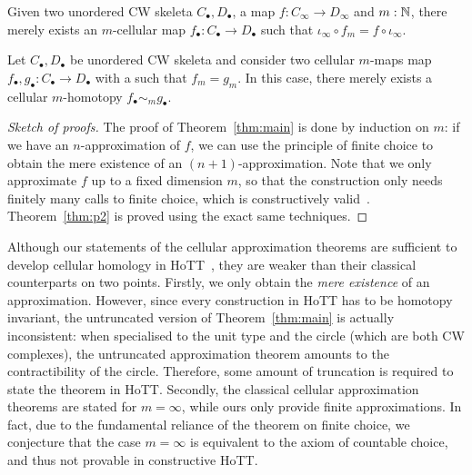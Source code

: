 \documentclass{easychair}
\begin{document}
\begin{theorem}\label{thm:main}
  Given two unordered CW skeleta $C_\bullet,D_\bullet$, a map $f : C_\infty \to  D_\infty$ and
  $m:\mathbb{N}$, there merely exists an $m$-cellular map $f_\bullet : C_\bullet \to D_{\bullet}$ such that
  $\iota_{\infty} \circ f_m = f \circ \iota_{\infty}$.
\end{theorem}

\begin{theorem}\label{thm:p2}
  Let $C_\bullet,D_\bullet$ be unordered CW skeleta and consider two
  cellular $m$-maps map $f_\bullet,g_\bullet : C_\bullet \to D_\bullet$ with a
  such that $f_m = g_m$. In this case, there merely exists a
  cellular $m$-homotopy $f_\bullet \sim_m g_\bullet$.
\end{theorem}

\begin{proof}[Sketch of proofs]
The proof of Theorem~\ref{thm:main} is done by induction on \( m \):
%
if we have an \( n \)-approximation of \( f \), we can use the principle of finite choice to obtain
the mere existence of an \( (n+1) \)-approximation.
%
Note that we only approximate \( f \) up to a fixed dimension \( m \), so that the construction
only needs finitely many calls to finite choice, which is constructively valid~\cite[exercise 3.22]{HoTT13}.
%
Theorem~\ref{thm:p2} is proved using the exact same techniques.
\end{proof}

Although our statements of the cellular approximation theorems are sufficient to develop cellular homology in HoTT~\cite{CellHomology}, they are weaker than their classical counterparts on two
points.
%
Firstly, we only obtain the \emph{mere existence} of an approximation. However, since every
construction in HoTT has to be homotopy invariant, the untruncated version of Theorem~\ref{thm:main} is actually
inconsistent: when specialised to the unit type and the circle (which are both CW complexes),
the untruncated approximation theorem amounts to the contractibility of the circle.
Therefore, some amount of truncation is required to state the theorem in HoTT.
%
Secondly, the classical cellular approximation theorems are stated for \( m = \infty \), while
ours only provide finite approximations.
%
In fact, due to the fundamental reliance of the theorem on finite choice, we conjecture that the
case \( m = \infty \) is equivalent to the axiom of countable choice, and thus not provable in
constructive HoTT.
\end{document}
